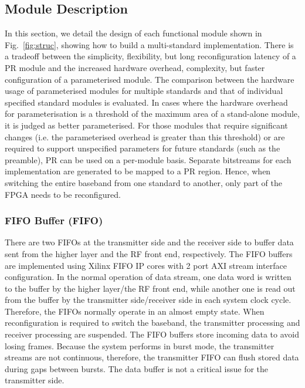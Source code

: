 \subsection{Module Description}\label{sec:7module}

In this section, we detail the design of each functional module shown in Fig.~\ref{fig:struc}, showing how to build a multi-standard implementation.
There is a tradeoff between the simplicity, flexibility, but long reconfiguration latency of a PR module and the increased hardware overhead, complexity, but faster configuration of a parameterised module.
The comparison between the hardware usage of parameterised modules for multiple standards and that of individual specified standard modules is evaluated.
In cases where the hardware overhead for parameterisation is a threshold of the maximum area of a stand-alone module, it is judged as better parameterised.
For those modules that require significant changes (i.e. the parameterised overhead is greater than this threshold) or are required to support unspecified parameters for future standards (such as the preamble), PR can be used on a per-module basis.
Separate bitstreams for each implementation are generated to be mapped to a PR region.
Hence, when switching the entire baseband from one standard to another, only part of the FPGA needs to be reconfigured.

\subsubsection{FIFO Buffer (FIFO)}
There are two FIFOs at the transmitter side and the receiver side to buffer data sent from the higher layer and the RF front end, respectively.
The FIFO buffers are implemented using Xilinx FIFO IP cores with 2 port AXI stream interface configuration.
In the normal operation of data stream, one data word is written to the buffer by the higher layer/the RF front end, while another one is read out from the buffer by the transmitter side/receiver side in each system clock cycle.
Therefore, the FIFOs normally operate in an almost empty state.
When reconfiguration is required to switch the baseband, the transmitter processing and receiver processing are suspended.
The FIFO buffers store incoming data to avoid losing frames.
Because the system performs in burst mode, the transmitter streams are not continuous, therefore, the transmitter FIFO can flush stored data during  gaps between bursts.
The data buffer is not a critical issue for the transmitter side.

